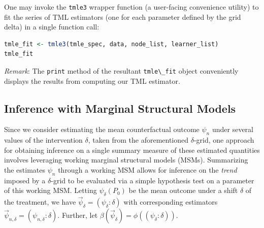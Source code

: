 \documentclass[12pt, krantz2,]{krantz}
\newcommand{\passthrough}[1]{#1}
\theoremstyle{definition}
\theoremstyle{definition}
\theoremstyle{definition}
\newcommand{\1}{\mathbbm{1}}
\begin{document}
One may invoke the \passthrough{\lstinline!tmle3!} wrapper function (a user-facing convenience utility)
to fit the series of TML estimators (one for each parameter defined by the grid
delta) in a single function call:

\begin{lstlisting}[language=R]
tmle_fit <- tmle3(tmle_spec, data, node_list, learner_list)
tmle_fit
\end{lstlisting}

\emph{Remark}: The \passthrough{\lstinline!print!} method of the resultant \passthrough{\lstinline!tmle\_fit!} object conveniently
displays the results from computing our TML estimator.

\hypertarget{inference-with-marginal-structural-models}{%
\subsection{Inference with Marginal Structural Models}\label{inference-with-marginal-structural-models}}

Since we consider estimating the mean counterfactual outcome \(\psi_n\) under
several values of the intervention \(\delta\), taken from the aforementioned
\(\delta\)-grid, one approach for obtaining inference on a single summary measure
of these estimated quantities involves leveraging working marginal structural
models (MSMs). Summarizing the estimates \(\psi_n\) through a working MSM allows
for inference on the \emph{trend} imposed by a \(\delta\)-grid to be evaluated via a
simple hypothesis test on a parameter of this working MSM. Letting
\(\psi_{\delta}(P_0)\) be the mean outcome under a shift \(\delta\) of the
treatment, we have \(\vec{\psi}_{\delta} = (\psi_{\delta}: \delta)\) with
corresponding estimators \(\vec{\psi}_{n, \delta} = (\psi_{n, \delta}: \delta)\).
Further, let \(\beta(\vec{\psi}_{\delta}) = \phi((\psi_{\delta}: \delta))\).
\end{document}
